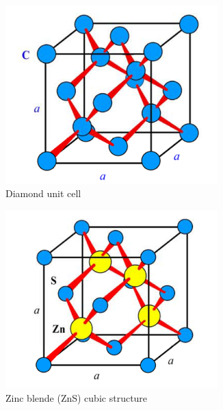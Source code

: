 \begin{figure}[ht!]
    \begin{subfigure}[t]{0.24\linewidth}
        \centering
        \includegraphics[width=0.9\textwidth]{images/diamond.png}
        \caption{Diamond unit cell}
    \end{subfigure}
    \begin{subfigure}[t]{0.24\linewidth}
        \centering
        \includegraphics[width=0.9\textwidth]{images/zns.png}
        \caption{Zinc blende (ZnS) cubic structure}
    \end{subfigure} 
    \begin{subfigure}[t]{0.24\linewidth}
        \centering

\end{subfigure}
\end{figure}
